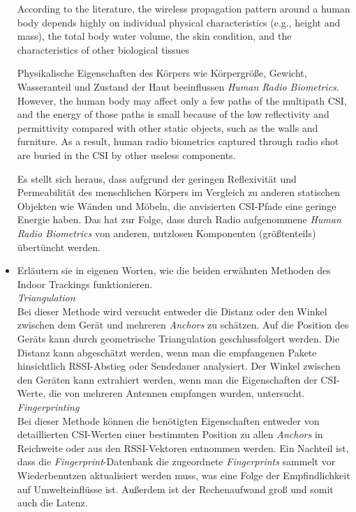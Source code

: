 \begin{itemize}
    \glqq According to the literature, the wireless 
    propagation pattern around a human body depends
    highly on individual physical characteristics
    (e.g., height and mass), the total body water 
    volume, the skin condition, and the characteristics 
    of other biological tissues\grqq

    Physikalische Eigenschaften des Körpers wie 
    Körpergröße, Gewicht, Wasseranteil und Zustand 
    der Haut beeinflussen \textit{Human Radio 
    Biometrics}.\\[1mm]

    \glqq However, the human body may affect only a 
    few paths of the multipath CSI, and the energy 
    of those paths is small because of the low 
    reflectivity and permittivity compared with 
    other static objects, such as the walls and 
    furniture. As a result, human radio biometrics
    captured through radio shot are buried in the 
    CSI by other useless components.\grqq
    
    Es stellt sich heraus, dass aufgrund der geringen
    Reflexivität und Permeabilität des menschlichen 
    Körpers im Vergleich zu anderen statischen Objekten 
    wie Wänden und Möbeln, die anvisierten CSI-Pfade 
    eine geringe Energie haben. Das hat zur Folge, dass 
    durch Radio aufgenommene \textit{Human Radio Biometrics} 
    von anderen, nutzlosen Komponenten (größtenteils) 
    übertüncht werden.

    \item Erläutern sie in eigenen Worten, wie die beiden 
    erwähnten Methoden des Indoor Trackings
    funktionieren.\\[1mm]


    \textit{Triangulation}\\
    Bei dieser Methode wird versucht entweder die Distanz 
    oder den Winkel zwischen dem Gerät und mehreren 
    \textit{Anchors} zu schätzen. Auf die  Position des 
    Geräts kann durch geometrische Triangulation 
    geschlussfolgert werden. Die Distanz kann abgeschätzt 
    werden, wenn man die empfangenen Pakete hinsichtlich
    RSSI-Abstieg oder Sendedauer analysiert. Der Winkel 
    zwischen den Geräten kann extrahiert werden, wenn man 
    die Eigenschaften der CSI-Werte, die von mehreren 
    Antennen empfangen wurden, untersucht.\\[1mm]
    
    \textit{Fingerprinting}\\
    Bei dieser Methode können die benötigten Eigenschaften
    entweder von detaillierten CSI-Werten einer bestimmten 
    Position zu allen \textit{Anchors} in Reichweite oder
    aus den RSSI-Vektoren entnommen werden.
    Ein Nachteil ist, dass die \textit{Fingerprint}-Datenbank
    die zugeordnete \textit{Fingerprints} sammelt vor 
    Wiederbenutzen aktualisiert werden muss, was eine Folge
    der Empfindlichkeit auf Umwelteinflüsse ist.
    Außerdem ist der Rechenaufwand groß und somit auch die 
    Latenz.
    \end{itemize}



